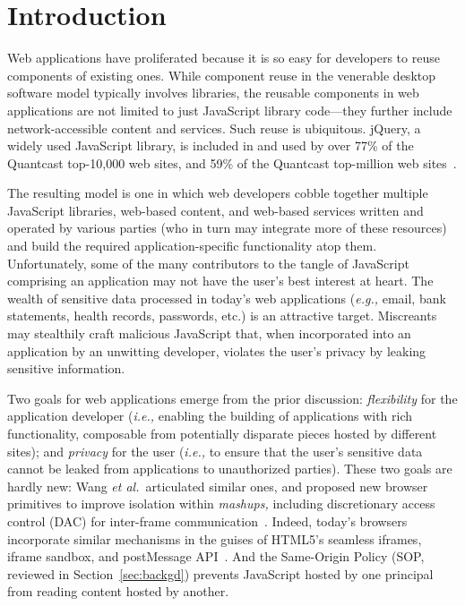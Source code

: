 \section{Introduction}
\label{sec:intro}

Web applications have proliferated because it is so easy for
developers to reuse components of existing ones. While component reuse
in the venerable desktop software model typically involves libraries,
the reusable components in web applications are not limited to just
JavaScript library code---they further include network-accessible
content and services. Such reuse is ubiquitous\@. jQuery, a widely used
JavaScript library, is included in and used by over 77\% of the
Quantcast top-10,000 web sites, and 59\% of the Quantcast top-million
web sites~\cite{quantcast}.

The resulting model is one in which web developers cobble together
multiple JavaScript libraries, web-based content, and web-based
services written and operated by various parties (who in turn may
integrate more of these resources) and build the required
application-specific functionality atop them. Unfortunately, some of
the many contributors to the tangle of JavaScript comprising an
application may not have the user's best interest at heart. The wealth
of sensitive data processed in today's web applications (\emph{e.g.,} email,
bank statements, health records, passwords, etc.) is an attractive
target. Miscreants may stealthily craft malicious JavaScript that,
when incorporated into an application by an unwitting developer,
violates the user's privacy by leaking sensitive information.

Two goals for web applications emerge from the prior discussion:
\emph{flexibility} for the application developer (\emph{i.e.,} enabling the
building of applications with rich functionality, composable from
potentially disparate pieces hosted by different sites); and
\emph{privacy} for the user (\emph{i.e.,} to ensure that the user's sensitive
data cannot be leaked from applications to unauthorized parties).
These two goals are hardly new: Wang {\em et al.}~articulated similar
ones, and proposed new browser primitives to improve isolation within
{\em mashups,} including discretionary access control (DAC) for inter-frame
communication~\cite{mashupos}. Indeed, today's browsers incorporate
similar mechanisms in the guises of HTML5's seamless iframes, iframe
sandbox, and postMessage API~\cite{html5}. And the Same-Origin Policy
(SOP, reviewed in Section~\ref{sec:backgd}) prevents JavaScript hosted
by one principal from reading content hosted by another.

